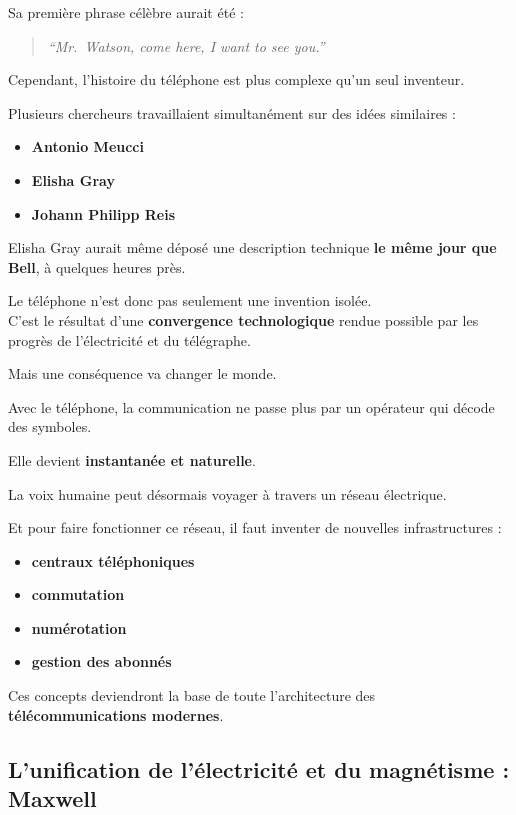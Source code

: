 \documentclass[
  french,
]{article}
\providecommand{\tightlist}{%
  \setlength{\itemsep}{0pt}\setlength{\parskip}{0pt}}
\begin{document}
Sa première phrase célèbre aurait été :

\begin{quote}
\emph{``Mr.~Watson, come here, I want to see you.''}
\end{quote}

Cependant, l'histoire du téléphone est plus complexe qu'un seul
inventeur.

Plusieurs chercheurs travaillaient simultanément sur des idées
similaires :

\begin{itemize}
\tightlist
\item
  \textbf{Antonio Meucci}
\item
  \textbf{Elisha Gray}
\item
  \textbf{Johann Philipp Reis}
\end{itemize}

Elisha Gray aurait même déposé une description technique \textbf{le même
jour que Bell}, à quelques heures près.

Le téléphone n'est donc pas seulement une invention isolée.\\
C'est le résultat d'une \textbf{convergence technologique} rendue
possible par les progrès de l'électricité et du télégraphe.

Mais une conséquence va changer le monde.

Avec le téléphone, la communication ne passe plus par un opérateur qui
décode des symboles.

Elle devient \textbf{instantanée et naturelle}.

La voix humaine peut désormais voyager à travers un réseau électrique.

Et pour faire fonctionner ce réseau, il faut inventer de nouvelles
infrastructures :

\begin{itemize}
\tightlist
\item
  \textbf{centraux téléphoniques}
\item
  \textbf{commutation}
\item
  \textbf{numérotation}
\item
  \textbf{gestion des abonnés}
\end{itemize}

Ces concepts deviendront la base de toute l'architecture des
\textbf{télécommunications modernes}.

\subsection{L'unification de l'électricité et du magnétisme :
Maxwell}\label{lunification-de-luxe9lectricituxe9-et-du-magnuxe9tisme-maxwell}
\end{document}
